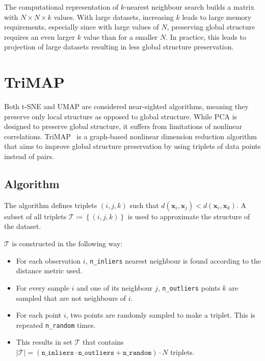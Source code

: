 The computational representation of $k$-nearest neighbour search builds a matrix with $N \times N \times k$ values. With large datasets, increasing $k$ leads to large memory requirements, especially since with large values of $N$, preserving global structure requires an even larger $k$ value than for a smaller $N$. In practice, this leads to projection of large datasets resulting in less global structure preservation.

\section{TriMAP}\label{sec:trimap}

Both t-SNE and UMAP are considered near-sighted algorithms, meaning they preserve only local structure as opposed to global structure. While PCA is designed to preserve global structure, it suffers from limitations of nonlinear correlations. TriMAP~\cite{bib:trimap} is a graph-based nonlinear dimension reduction algorithm that aims to improve global structure preservation by using triplets of data points instead of pairs.



\subsection{Algorithm}

The algorithm defines triplets $(i, j, k)$ such that $d(\mathbf{x}_i, \mathbf{x}_j) < d(\mathbf{x}_i, \mathbf{x}_k)$. A subset of all triplets $\mathcal{T} \coloneqq \left\lbrace (i,j,k) \right\rbrace$ is used to approximate the structure of the dataset.

$\mathcal{T}$ is constructed in the following way:

\begin{itemize}
	\item For each observation $i$, \texttt{n\_inliers} nearest neighbour is found according to the distance metric used.
	\item For every sample $i$ and one of its neighbour $j$, \texttt{n\_outliers} points $k$ are sampled that are not neighbours of $i$.
	\item For each point $i$, two points are randomly sampled to make a triplet. This is repeated \texttt{n\_random} times.
	\item This results in set $\mathcal{T}$ that contains $\vert \mathcal{T} \vert = (\texttt{n\_inliers} \cdot \texttt{n\_outliers} + \texttt{n\_random}) \cdot N$ triplets.
\end{itemize}

